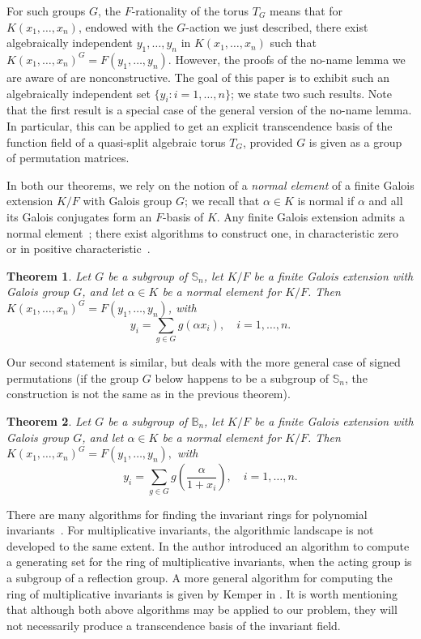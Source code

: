 \documentclass[12pt]{article}
\theoremstyle{plain}
\newtheorem{theorem}{Theorem}
\begin{document}
For such groups $G$, the $F$-rationality of the torus $T_{G}$ means
that for $K(x_1,\dots,x_n)$, endowed with the $G$-action we just
described, there exist algebraically independent $y_1,\dots,y_n$ in 
$K(x_1,\dots,x_n)$ such that $K(x_1,\dots,x_n)^G=F(y_1,\dots,y_n)$. 
However, the proofs of the no-name lemma we are aware of
are nonconstructive.  The goal of this paper is to exhibit such 
an algebraically independent set $\{y_i:i=1,\dots,n\}$; we
state two such results. Note that the first result is a special case of
 the general version of the no-name lemma. In particular, this can be 
 applied to get an explicit transcendence basis of the function field 
 of a quasi-split algebraic torus $T_G$, provided $G$ is given as a group 
 of permutation matrices.

In both our theorems, we rely on the notion of a {\em normal element} of
a finite Galois extension $K/F$ with Galois group $G$; we recall that
$\alpha \in K$ is normal if $\alpha$ and all its Galois conjugates
form an $F$-basis of $K$.  Any finite Galois extension admits a normal
element~\cite[Theorem 6.13.1]{Lang}; there exist algorithms to
construct one, in characteristic zero~\cite{Girstmair} or in positive
characteristic~\cite{Giesbrecht,Poli}.

\begin{theorem}\label{nonamenonsign}
  Let $G$ be a subgroup of $\mathbb{S}_n$, let $K/F$ be a finite
  Galois extension with Galois group $G$, and let $\alpha \in K$ be a
  normal element for $K/F$. Then $ K(x_1,\ldots ,
  x_n)^G=F(y_1,\dots,y_n)$, with
  $$y_i =\sum_{g \in G} g(\alpha x_i), \quad i = 1,\dots,n.$$
\end{theorem}

Our second statement is similar, but deals with the more general case
of signed permutations (if the group $G$ below happens to be a subgroup of $\mathbb{S}_n$,  
the construction is not the same as in the previous theorem).

\begin{theorem}\label{nonamesign}
  Let $G$ be a subgroup of $\mathbb{B}_n$, let $K/F$ be a finite
  Galois extension with Galois group $G$, and let $\alpha \in K$ be a
  normal element for $K/F$. Then
  $K(x_1,\ldots, x_n)^G = F(y_1, \ldots, y_{n}),$
  with $$y_i = \sum_{g \in G} g\left (\frac{\alpha}{1+x_i}\right), \quad i = 1,\dots,n.$$
\end{theorem}

There are many algorithms for finding the invariant rings for
polynomial invariants~\cite{Sturmfels,Kemper2}. For multiplicative
invariants, the algorithmic landscape is not developed to the same
extent. In \cite{Renault} the author introduced an algorithm to 
compute a generating set for the ring of multiplicative invariants, 
when the acting group is a subgroup of a reflection group. A more 
general algorithm for computing the ring of multiplicative invariants
 is given by Kemper in \cite{Kemper}. It is worth mentioning that although 
both above algorithms may be applied to our problem, they 
will not necessarily produce a transcendence basis of the invariant field. 
\end{document}
